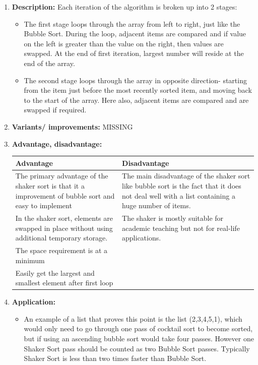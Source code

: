 \documentclass[11pt,a4paper]{article}
\begin{document}
{\begin{enumerate}[label=\textbf{\arabic*})]
				\item \textbf{Description:}
					Each iteration of the algorithm is broken up into 2 stages: 
					\begin{itemize}
						\item The first stage loops through the array from left to right, just like the Bubble Sort. During the loop, adjacent items are compared and if value on the left is greater than the value on the right, then values are swapped. At the end of first iteration, largest number will reside at the end of the array.
						\item The second stage loops through the array in opposite direction- starting from the item just before the most recently sorted item, and moving back to the start of the array. Here also, adjacent items are compared and are swapped if required.
					\end{itemize}
				\item \textbf{Variants/ improvements:}
					MISSING
				\item \textbf{Advantage, disadvantage:}
					\begin{table}[H]
						\centering
						\begin{tabular}{|p{8cm}|p{8cm}|}
							\hline
							\textbf{Advantage} & \textbf{Disadvantage} \\
							\hline
							\hline
							The primary advantage of the shaker sort is that it a improvement of bubble sort and easy to implement & The main disadvantage of the shaker sort like bubble sort is the fact that it does not deal well with a list containing a huge number of items. \\[12pt]
							In the shaker sort, elements are swapped in place without using additional temporary storage. 		   & The shaker is mostly suitable for academic teaching but not for real-life applications.\\[12pt]
							The space requirement is at a minimum & \\[12pt]
							Easily get the largest and smallest element after first loop & \\
							\hline
						\end{tabular}
					\end{table}
				\item \textbf{Application:}	
					\begin{itemize}
						\item An example of a list that proves this point is the list (2,3,4,5,1), which would only need to go through one pass of cocktail sort to become sorted, but if using an ascending bubble sort would take four passes. However one Shaker Sort pass should be counted as two Bubble Sort passes. Typically Shaker Sort is less than two times faster than Bubble Sort.

\end{itemize}
\end{enumerate}}
\end{document}
